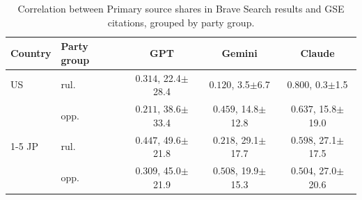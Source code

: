 \begin{table}[t]
\centering
\footnotesize
\setlength{\tabcolsep}{1.8pt}
\caption{Correlation between Primary source shares in Brave Search results and GSE citations, grouped by party group.}
\label{tab:brave-gse-primary-share-correlation-party-group}
\begin{tabular}{llccc}
\toprule
\textbf{Country} & \textbf{Party group} & \textbf{GPT} & \textbf{Gemini} & \textbf{Claude} \\
\midrule
US & rul. & \textcolor{red!50!black}{$0.314$}, 22.4$\pm$28.4 & \textcolor{red!30!black}{$0.120$}, 3.5$\pm$6.7 & \textcolor{red!90!black}{$0.800$}, 0.3$\pm$1.5 \\
 & opp. & \textcolor{red!30!black}{$0.211$}, 38.6$\pm$33.4 & \textcolor{red!50!black}{$0.459$}, 14.8$\pm$12.8 & \textcolor{red!70!black}{$0.637$}, 15.8$\pm$19.0 \\
\cmidrule(lr){1-5}
JP & rul. & \textcolor{red!50!black}{$0.447$}, 49.6$\pm$21.8 & \textcolor{red!30!black}{$0.218$}, 29.1$\pm$17.7 & \textcolor{red!70!black}{$0.598$}, 27.1$\pm$17.5 \\
 & opp. & \textcolor{red!50!black}{$0.309$}, 45.0$\pm$21.9 & \textcolor{red!70!black}{$0.508$}, 19.9$\pm$15.3 & \textcolor{red!70!black}{$0.504$}, 27.0$\pm$20.6 \\
\bottomrule
\end{tabular}
\end{table}
